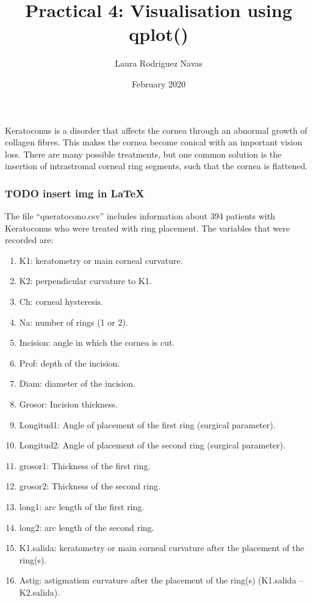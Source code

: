 \documentclass[
]{article}
\title{Practical 4: Visualisation using qplot()}
\author{Laura Rodriguez Navas}
\date{February 2020}
\providecommand{\tightlist}{%
  \setlength{\itemsep}{0pt}\setlength{\parskip}{0pt}}
\begin{document}
\maketitle

Keratoconus is a disorder that affects the cornea through an abnormal
growth of collagen fibres. This makes the cornea become conical with an
important vision loss. There are many possible treatments, but one
common solution is the insertion of intrastromal corneal ring segments,
such that the cornea is flattened.

\hypertarget{todo-insert-img-in-latex}{%
\subsubsection{TODO insert img in
LaTeX}\label{todo-insert-img-in-latex}}

The file ``queratocono.csv'' includes information about 394 patients
with Keratoconus who were treated with ring placement. The variables
that were recorded are:

\begin{enumerate}
\def\labelenumi{\arabic{enumi}.}
\tightlist
\item
  K1: keratometry or main corneal curvature.
\item
  K2: perpendicular curvature to K1.
\item
  Ch: corneal hysteresis.
\item
  Na: number of rings (1 or 2).
\item
  Incision: angle in which the cornea is cut.
\item
  Prof: depth of the incision.
\item
  Diam: diameter of the incision.
\item
  Grosor: Incision thickness.
\item
  Longitud1: Angle of placement of the first ring (surgical parameter).
\item
  Longitud2: Angle of placement of the second ring (surgical parameter).
\item
  grosor1: Thickness of the first ring.
\item
  grosor2: Thickness of the second ring.
\item
  long1: arc length of the first ring.
\item
  long2: arc length of the second ring.
\item
  K1.salida: keratometry or main corneal curvature after the placement
  of the ring(s).
\item
  Astig: astigmatism curvature after the placement of the ring(s)
  (K1.salida -- K2.salida).
\end{enumerate}
\end{document}

